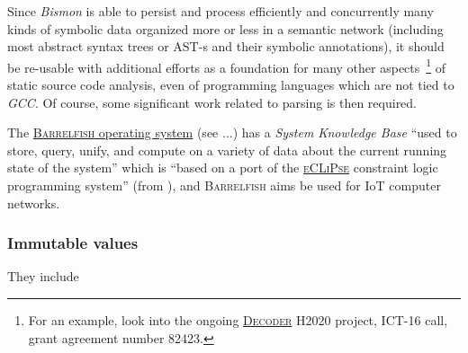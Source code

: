 \medskip

Since \emph{Bismon} is able to persist and process efficiently and
concurrently many kinds of symbolic data organized more or less in a
semantic network (including most abstract syntax trees or AST-s
 and their symbolic annotations), it should be re-usable
with additional efforts as a foundation for many other
aspects~\footnote{For an example, look into the ongoing 
  \href{https://www.decoder-project.eu/}{\textsc{Decoder}}
   H2020
  project, ICT-16 call, grant agreement number 82423.} of static
source code analysis, even of programming languages which are not tied
to \emph{GCC}. Of course, some significant work related to parsing is
then required.

The \href{http://www.barrelfish.org/}{\textsc{Barrelfish} operating
  system}  (see \cite{gerber:2018:authorization,
    giceva:2016:customized, Schupbach:2008:embracing}...) has a
  \emph{System Knowledge Base} ``used to store, query, unify, and
  compute on a variety of data about the current running state of the
  system'' which is ``based on a port of the
  \href{https://eclipseclp.org/}{\textsc{eCLiPse}} constraint logic
  programming system'' \cite{Apt:2006:constraint} (from
  \cite{barrelfish:2013:overview}), and \textsc{Barrelfish} aims be
  used for IoT computer networks.

\subsubsection{Immutable values}
\label{subsubsec:immutvalues}

They include


